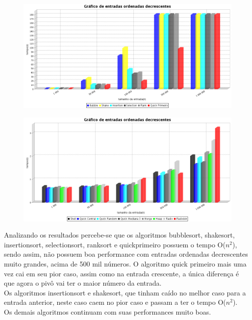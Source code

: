 \documentclass{article}
\begin{document}
\begin{flushleft}
\begin{itemize}
\begin{figure}[!htb]	
   	\includegraphics[width=16cm]{grafico3.png}
\end{figure} 
\begin{figure}[!htb]	
   	\includegraphics[width=16cm]{grafico4.png}
\end{figure} 

\newpage

\hspace{10mm} Analizando os resultados percebe-se que os algoritmos bubblesort, shakesort, insertionsort, selectionsort, ranksort e quickprimeiro possuem o tempo O($n^{2}$), sendo assim, não possuem boa performance com entradas ordenadas decrescentes muito grandes, acima de 500 mil números. O algoritmo quick primeiro mais uma vez cai em seu pior caso, assim como na entrada crescente, a única diferença é que agora o pivô vai ter o maior número da entrada. \\
\hspace{10mm} Os algoritmos insertionsort e shakesort, que tinham caído no melhor caso para a entrada anterior, neste caso caem no pior caso e passam a ter o tempo O($n^{2}$). \\
\hspace{10mm} Os demais algoritmos continuam com suas performances muito boas. \\ [2cm]


\end{itemize}
\end{flushleft}
\end{document}
